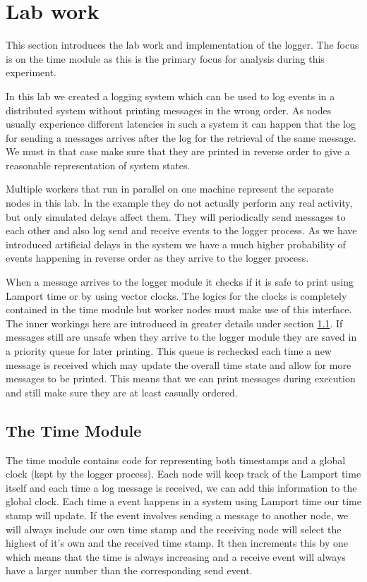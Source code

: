 \chapter{Lab work} 
\label{chap_Intro}
This section introduces the lab work and implementation of the logger. The focus is on the time module as this is the primary focus for analysis during this experiment.

In this lab we created a logging system which can be used to log events in a distributed system without printing messages in the wrong order. As nodes usually experience different latencies in such a system it can happen that the log for sending a messages arrives after the log for the retrieval of the same message. We must in that case make sure that they are printed in reverse order to give a reasonable representation of system states.

Multiple workers that run in parallel on one machine represent the separate nodes in this lab. In the example they do not actually perform any real activity, but only simulated delays affect them. They will periodically send messages to each other and also log send and receive events to the logger process. As we have introduced artificial delays in the system we have a much higher probability of events happening in reverse order as they arrive to the logger process.

When a message arrives to the logger module it checks if it is safe to print using Lamport time or by using vector clocks. The logics for the clocks is completely contained in the time module but worker nodes must make use of this interface. The inner workings here are introduced in greater details under section \ref{time-module}. If messages still are unsafe when they arrive to the logger module they are saved in a priority queue for later printing. This queue is rechecked each time a new message is received which may update the overall time state and allow for more messages to be printed. This means that we can print messages during execution and still make sure they are at least casually ordered.

 
\section{The Time Module}
\label{time-module}
The time module contains code for representing both timestamps and a global clock (kept by the logger process). Each node will keep track of the Lamport time itself and each time a log message is received, we can add this information to the global clock. Each time a event happens in a system using Lamport time our time stamp will update. If the event involves sending a message to another node, we will always include our own time stamp and the receiving node will select the highest of it's own and the received time stamp. It then increments this by one which means that the time is always increasing and a receive event will always have a larger number than the corresponding send event.

